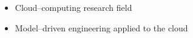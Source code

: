 

\begin{itemize}
\item Cloud--computing research field~\cite{Armbrust:EECS-2009-28}
\item Model--driven engineering applied to the cloud
\end{itemize}